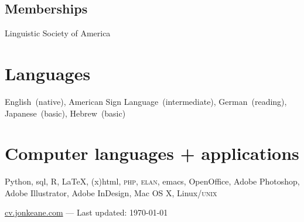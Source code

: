 \documentclass[10pt, letterpaper]{article}
\newcommand{\years}[1]{\marginpar{\scriptsize #1}}
\begin{document}
\subsection*{Memberships}
\label{sec:memberships}
\-\years{2008--}Linguistic Society of America

\section*{Languages}
\label{sec:languages}
English~(native), American Sign Language~(intermediate), German~(reading), Japanese~(basic), Hebrew~(basic)

\section*{Computer languages + applications}
\label{sec:computer}
Python, {\sc sql}, R, \LaTeX, {\sc (x)html}, \textsc{php}, \textsc{elan}, emacs, OpenOffice, Adobe Photoshop, Adobe Illustrator, Adobe InDesign, Mac OS X, Linux/\textsc{unix}

\vfill{}
\hrulefill
\begin{center}
{\footnotesize \href{http://cv.jonkeane.com}{cv.jonkeane.com} — Last updated: \isodate\today}
\end{center}
\end{document}
